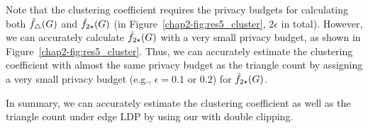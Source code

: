Note that the clustering coefficient requires the privacy budgets for
calculating both $\hat{f}_\triangle(G)$ and $\hat{f}_{2\star}(G)$
(in Figure~\ref{chap2-fig:res5_cluster}, $2\epsilon$ in total).
However, we can accurately
calculate $\hat{f}_{2\star}(G)$
with a very small privacy budget, as shown in Figure~\ref{chap2-fig:res5_cluster}.
Thus, we can accurately estimate the clustering coefficient with almost the same privacy budget as
the triangle count
by assigning a very small privacy budget (e.g., $\epsilon=0.1$ or $0.2$) for
$\hat{f}_{2\star}(G)$.

In summary, we can accurately estimate the clustering coefficient as well as the triangle count under edge LDP by using our \AlgTwo{} with double clipping.

